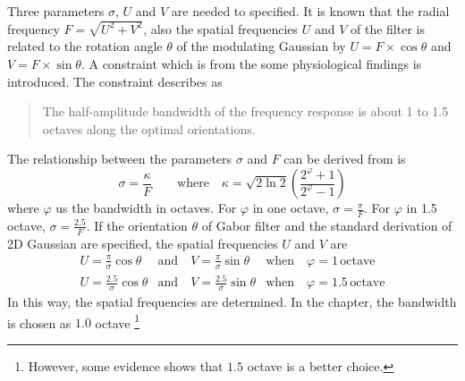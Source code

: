 Three parameters $\sigma$, $U$ and $V$ are needed to specified. It is known that the radial frequency $F=\sqrt{U^2+V^2}$, also the spatial frequencies $U$ and $V$ of the filter is related to the rotation angle $\theta$ of the modulating Gaussian by $U=F\times \cos\theta$ and $V=F\times \sin\theta$. A constraint which is from the some physiological findings \cite{Daugman1985, Lee1996} is introduced. The constraint describes as
\begin{quotation}
The half-amplitude bandwidth of the frequency response is about 1 to 1.5 octaves along the optimal orientations. \cite{Lee1996}
\end{quotation} 
The relationship between the parameters $\sigma$ and $F$ can be derived from \cite{Lee1996} is
\begin{equation}
 \sigma = \frac{\kappa}{F} \qquad \textrm{where}\quad \kappa=\sqrt{2\ln2}(\frac{2^\varphi+1}{2^\varphi-1})
\end{equation}
where $\varphi$ us the bandwidth in octaves. For $\varphi$ in one octave, $\sigma=\frac{\pi}{F}$. For $\varphi$ in 1.5 octave, $\sigma=\frac{2.5}{F}$. If the orientation $\theta$ of Gabor filter and the standard derivation of 2D Gaussian are specified, the spatial frequencies $U$ and $V$ are
\begin{displaymath}
 \begin{array}{lll}
  U=\frac{\pi}{\sigma}\cos\theta & \textrm{and}\quad V=\frac{\pi}{\sigma}\sin\theta & \textrm{when} \quad \varphi = 1\, \mathrm{octave} \\
  U=\frac{2.5}{\sigma}\cos\theta & \textrm{and}\quad V=\frac{2.5}{\sigma}\sin\theta & \textrm{when} \quad \varphi = 1.5\, \mathrm{octave} 
 \end{array}
\end{displaymath}
In this way, the spatial frequencies are determined. In the chapter, the bandwidth is chosen as $1.0$ octave \footnote{However, some evidence \cite{Lee1996} shows that $1.5$ octave is a better choice.}

